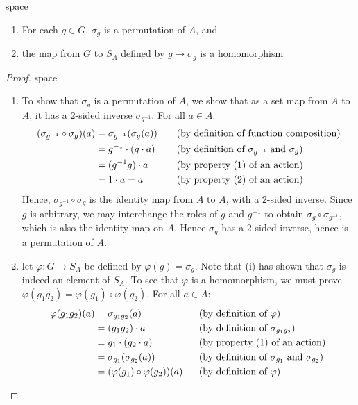 \begin{proposition}{\color{white}space}
\begin{enumerate}[label=(\roman*)]
\setlength{\itemsep}{0pt}
\item For each $g\in G$, $\sigma_g$ is a permutation of $A$, and
\item the map from $G$ to $S_A$ defined by $g \mapsto \sigma_g$ is a homomorphism
\end{enumerate}
\end{proposition}
\begin{proof}{\color{white}space}
\begin{enumerate}[label=(\roman*)]
\setlength{\itemsep}{0pt}
\item To show that $\sigma_g$ is a permutation of $A$, we show that as a set map from $A$ to $A$, it has a $2$-sided inverse $\sigma_{g^{-1}}$. For all $a \in A$: 
\begin{alignat*}{2}
(\sigma_{g^{-1}} \circ \sigma_g)(a) &= \sigma_{g^{-1}}(\sigma_g(a)) \ \ \ && \textnormal{(by definition of function composition)} \\
&= g^{-1} \cdot(g\cdot a) && \textnormal{(by definition of $\sigma_{g^{-1}}$ and $\sigma_g$)} \\
&= (g^{-1} g)\cdot a && \textnormal{(by property (1) of an action)} \\
&= 1 \cdot a = a && \textnormal{(by property (2) of an action)}
\end{alignat*}
Hence, $\sigma_{g^{-1}} \circ \sigma_{g}$ is the identity map from $A$ to $A$, with a $2$-sided inverse. Since $g$ is arbitrary, we may interchange the roles of $g$ and $g^{-1}$ to obtain $\sigma_{g} \circ \sigma_{g^{-1}}$, which is also the identity map on $A$. Hence $\sigma_{g}$ has a $2$-sided inverse, hence is a permutation of $A$.
\item let $\varphi: G \rightarrow S_A$ be defined by $\varphi(g) = \sigma_g$. Note that (i) has shown that $\sigma_g$ is indeed an element of $S_A$. To see that $\varphi$ is a homomorphism, we must prove $\varphi(g_1 g_2) = \varphi(g_1) \circ \varphi(g_2)$. For all $a\in A$:
\begin{alignat*}{2}
\varphi(g_1 g_2)(a) &= \sigma_{g_1 g_2} (a) \ \ \ && \textnormal{(by definition of $\varphi$)} \\
&= (g_1 g_2) \cdot a && \textnormal{(by definition of $\sigma_{g_1 g_2}$)} \\
&= g_1 \cdot (g_2 \cdot a) && \textnormal{(by property (1) of an action)} \\
&= \sigma_{g_1}(\sigma_{g_2} (a)) && \textnormal{(by definition of $\sigma_{g_1}$ and $\sigma_{g_2}$)} \\
&= (\varphi(g_1) \circ \varphi(g_2)) (a) \ \ && \textnormal{(by definition of $\varphi$)}
\end{alignat*}
\end{enumerate}
\end{proof}

